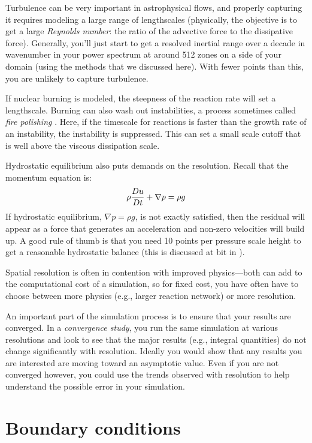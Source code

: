 Turbulence can be very important in astrophysical flows, and properly
capturing it requires modeling a large range of lengthscales
(physically, the objective is to get a large {\em Reynolds number}:
the ratio of the advective force to the dissipative force).
Generally, you'll just start to get a resolved inertial range over a
decade in wavenumber in your power spectrum at around 512 zones on a
side of your domain (using the methods that we discussed here).  With
fewer points than this, you are unlikely to capture turbulence.

If nuclear burning is modeled, the steepness of the reaction rate will
set a lengthscale.  Burning can also wash out instabilities, a process
sometimes called {\em fire polishing} \cite{timmeswoosley,SNrt}.
Here, if the timescale for reactions is faster than the growth rate of
an instability, the instability is suppressed.  This can set a small
scale cutoff that is well above the viscous dissipation scale.

Hydrostatic equilibrium also puts demands on the resolution.  Recall that
the momentum equation is:
\begin{equation}
\rho {\frac{{Du}}{D t}} + \nabla p = \rho g
\end{equation}
If hydrostatic equilibrium, $\nabla p = \rho g$, is not exactly
satisfied, then the residual will appear as a force that generates an
acceleration and non-zero velocities will build up.  A good rule of
thumb is that you need 10 points per pressure scale height to get a
reasonable hydrostatic balance (this is discussed at bit in
\cite{hse}).

Spatial resolution is often in contention with improved physics---both
can add to the computational cost of a simulation, so for fixed cost,
you have often have to choose between more physics (e.g., larger
reaction network) or more resolution.

An important part of the simulation process is to ensure that your
results are converged.  In a {\em convergence study}, you run the same
simulation at various resolutions and look to see that the major
results (e.g., integral quantities) do not change significantly with
resolution.  Ideally you would show that any results you are
interested are moving toward an asymptotic value.  Even if you are
not converged however, you could use the trends observed with resolution
to help understand the possible error in your simulation.





\section{Boundary conditions}

